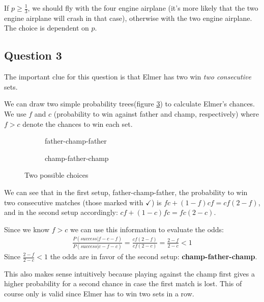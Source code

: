 \documentclass[../main/Notes.tex]{subfiles}
\begin{document}
If $p\geq\frac{1}{3}$, we should fly with the four engine airplane (it's more likely that the two engine airplane will crash in that case), otherwise with the two engine airplane. The choice is dependent on $p$.



\subsection*{Question 3}
The important clue for this question is that Elmer has two win \textit{two consecutive} sets.

We can draw two simple probability trees(figure \ref{fig:2014-06-06_mt3trees}) to calculate Elmer's chances. We use $f$ and $c$ (probability to win against father and champ, respectively) where $f > c$ denote the chances to win each set.
\begin{figure}[!ht]
  \centering
  \begin{subfigure}{.45\linewidth}
    \centering
    
    \caption{father-champ-father}
    \label{fig:2014-06-06_mt3tree1}
  \end{subfigure}
  \begin{subfigure}{.45\linewidth}
    \centering
    
    \caption{champ-father-champ}
    \label{fig:2014-06-06_mt3tree2}
  \end{subfigure}
  \caption{Two possible choices}
  \label{fig:2014-06-06_mt3trees}
\end{figure}

We can see that in the first setup, father-champ-father, the probability to win two consecutive matches (those marked with $\checkmark$) is $fc+(1-f)cf=cf(2-f)$, and in the second setup accordingly: $cf+(1-c)fc=fc(2-c)$.

Since we know $f>c$ we can use this information to evaluate the odds:
\begin{align*}
\frac{P(success|f-c-f)}{P(success|c-f-c)} = \frac{cf(2-f)}{cf(2-c)} = \frac{2-f}{2-c} < 1
\end{align*}
Since $\frac{2-f}{2-c} < 1$ the odds are in favor of the second setup: \textbf{champ-father-champ}.

This also makes sense intuitively because playing against the champ first gives a higher probability for a second chance in case the first match is lost. This of course only is valid since Elmer has to win two sets in a row.
\end{document}
